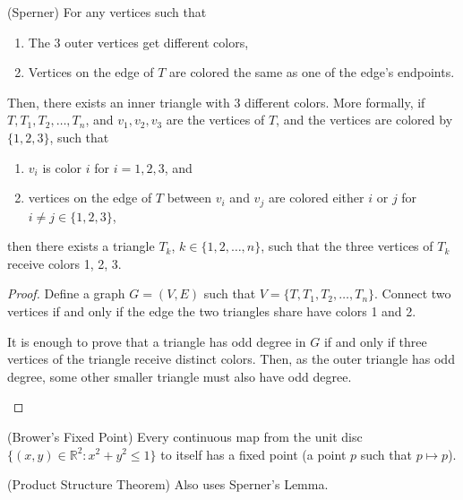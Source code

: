 \begin{lemma}
	(Sperner) For any vertices such that 
	\begin{enumerate}
		\item The 3 outer vertices get different colors,
		\item Vertices on the edge of \( T \) are colored the same as one of the edge's endpoints.
	\end{enumerate}
	Then, there exists an inner triangle with 3 different colors. More formally, if \( T, T_{1}, T_{2}, \ldots , T_n \), and \( v_{1},v_{2},v_{3} \) are the vertices of \( T \), and the vertices are colored by \( \{1, 2, 3\}   \), such that
	\begin{enumerate}
		\item \( v_i \) is color \( i \) for \( i=1, 2, 3 \), and 
		\item vertices on the edge of \( T \) between \( v_i \) and \( v_j \) are colored either \( i \) or \( j \) for \( i\neq j \in \{1, 2, 3\}  \),
	\end{enumerate}
	then there exists a triangle \( T_k \), \( k \in \{1,2,\ldots ,n\}   \), such that the three vertices of \( T_k \) receive colors 1, 2, 3.
\end{lemma}
\begin{proof}
	Define a graph \( G=(V,E) \) such that \( V = \{T, T_{1}, T_{2}, \ldots ,T_n\}   \). Connect two vertices if and only if the edge the two triangles share have colors 1 and 2. 
	\begin{observation}
		It is enough to prove that a triangle has odd degree in \( G \) if and only if three vertices of the triangle receive distinct colors. Then, as the outer triangle has odd degree, some other smaller triangle must also have odd degree.
	\end{observation}
\end{proof}

\begin{theorem}
	(Brower's Fixed Point)  Every continuous map from the unit disc \( \{(x, y) \in \mathbb{R}^{2} : x^{2}+y^{2}\le 1   \}  \) to itself has a fixed point (a point \( p \) such that \( p \mapsto p \)).
\end{theorem}

\begin{theorem}
	(Product Structure Theorem) Also uses Sperner's Lemma.
\end{theorem}
